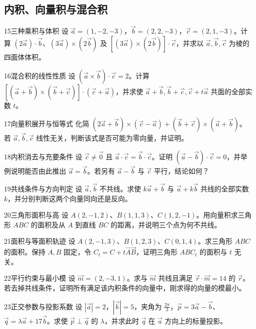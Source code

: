 \subsection{内积、向量积与混合积}
\begin{exercise}{15}{三种乘积与体积}
设 $\vec a=(1,-2,-3)$，$\vec b=(2,2,-3)$，$\vec c=(2,1,-3)$。计算 $(2\vec a)\cdot\vec b$、$(3\vec a)\times(2\vec b)$ 及 $[(3\vec a)\times(2\vec b)]\cdot\vec c$，并求以 $\vec a,\vec b,\vec c$ 为棱的四面体体积。
\end{exercise}
\begin{exercise}{16}{混合积的线性性质}
设 $(\vec a\times\vec b)\cdot\vec c=2$。计算 $[(\vec a+\vec b)\times(\vec b+\vec c)]\cdot(\vec c+\vec a)$，并求使 $\vec a+\vec b,\vec b+\vec c,\vec c+t\vec a$ 共面的全部实数 $t$。
\end{exercise}
\begin{exercise}{17}{向量积展开与恒等式}
化简 $(2\vec a+\vec b)\times(\vec c-\vec a)+(\vec b+\vec c)\times(\vec a+\vec b)$。若 $\vec a,\vec b,\vec c$ 线性无关，判断该式是否可能为零向量，并证明。
\end{exercise}
\begin{exercise}{18}{内积消去与充要条件}
设 $\vec c\ne\vec0$ 且 $\vec a\cdot\vec c=\vec b\cdot\vec c$。证明 $(\vec a-\vec b)\cdot\vec c=0$，并举例说明能否由此推出 $\vec a=\vec b$。若另有 $\vec a-\vec b$ 与 $\vec c$ 平行，结论如何？
\end{exercise}
\begin{exercise}{19}{共线条件与方向判定}
设 $\vec a,\vec b$ 不共线。求使 $k\vec a+\vec b$ 与 $\vec a+k\vec b$ 共线的全部实数 $k$，并分别判断这两个向量同向还是反向。
\end{exercise}
\begin{exercise}{20}{三角形面积与高}
设 $A(2,-1,2)$、$B(1,1,3)$、$C(1,2,-1)$。用向量积求三角形 $ABC$ 的面积及从 $A$ 到直线 $BC$ 的距离，并说明三个点为何不共线。
\end{exercise}
\begin{exercise}{21}{面积与等面积轨迹}
设 $A(2,-1,3)$、$B(1,2,3)$、$C(0,1,4)$。求三角形 $ABC$ 的面积。保持 $A,B$ 固定，令 $C_t=C+t\overrightarrow{AB}$，证明三角形 $ABC_t$ 的面积与 $t$ 无关。
\end{exercise}
\begin{exercise}{22}{平行约束与最小模}
设 $\vec m=(2,-3,1)$。求与 $\vec m$ 共线且满足 $\vec r\cdot\vec m=14$ 的 $\vec r$。若去掉共线条件，证明所有满足该内积条件的向量中，刚求得的向量的模最小。
\end{exercise}
\begin{exercise}{23}{正交参数与投影系数}
设 $|\vec a|=2$，$|\vec b|=5$，夹角为 $\frac{2\pi}3$，$\vec p=3\vec a-\vec b$、$\vec q=\lambda\vec a+17\vec b$。求使 $\vec p\perp\vec q$ 的 $\lambda$，并求此时 $\vec q$ 在 $\vec a$ 方向上的标量投影。
\end{exercise}
